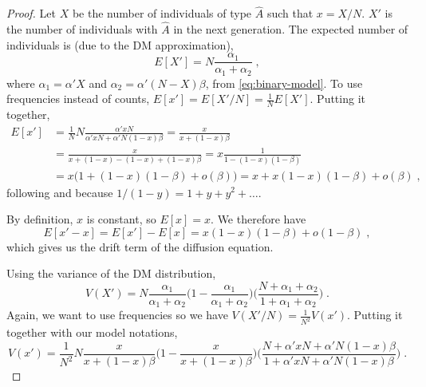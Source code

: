 \documentclass[12pt]{extarticle}
\begin{document}
\begin{proof}
Let $X$ be the number of individuals of type $\hat{A}$ such that $x=X/N$. $X'$ is the number of individuals with $\hat{A}$ in the next generation.
The expected number of individuals is (due to the DM approximation),
\begin{equation}
E[X'] = N  \frac{\alpha_1}{\alpha_1+\alpha_2} \;,
\end{equation}
where $\alpha_1 = \alpha' X$ and $\alpha_2 = \alpha'(N-X)\beta$, from  \cref{eq:binary-model}.
To use frequencies instead of counts, $E[x'] = E[X'/N] = \frac{1}{N}E[X']$.
Putting it together,
\begin{equation}
\begin{split}
E[x'] &= \frac{1}{N}N\frac{\alpha' xN}{\alpha' xN + \alpha' N (1-x)\beta}
	  = \frac{x}{x + (1-x)\beta} \\
	  &= \frac{x}{x + (1-x) -(1-x) + (1-x)\beta}
	  = x \frac{1}{1 -(1-x)(1-\beta)}  \\
	  &= x \big(1 + (1-x)(1-\beta) + o(\beta)\big)
	  = x + x(1-x)(1-\beta) + o(\beta) \;,
\end{split}
\end{equation}
following \citet[p.~253, ch~7.2]{durret} and because $1/(1-y)=1+y+y^2+\ldots$.

By definition, $x$ is constant, so $E[x] = x$.
We therefore have
\begin{equation}\label{eq:expec_freq}
E[x'-x] = E[x'] - E[x] = x(1-x)(1-\beta) + o(1-\beta) \;,
\end{equation}
which gives us the drift term of the diffusion equation.

Using the variance of the DM distribution,
\begin{equation}
V(X') = N\frac{\alpha_1}{\alpha_1+\alpha_2}
\Big(1-\frac{\alpha_1}{\alpha_1+\alpha_2}\Big)
\Big(\frac{N + \alpha_1+\alpha_2}{1+\alpha_1+\alpha_2}\Big) \;.
\end{equation}
Again, we want to use frequencies so we have $V(X'/N) = \frac{1}{N^2}V(x')$.
Putting it together with our model notations,
\begin{equation}
V(x') = \frac{1}{N^2}N\frac{x}{x+(1-x)\beta}\Big(1-\frac{x}{x+(1-x)\beta}\Big)
\Big(\frac{N + \alpha' xN + \alpha' N(1-x)\beta}{1 + \alpha' xN + \alpha' N(1-x)\beta}\Big) \;.
\end{equation}


\end{proof}
\end{document}
